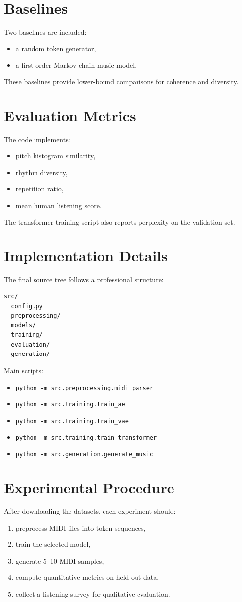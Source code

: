 \documentclass[11pt]{article}
\begin{document}
\section{Baselines}
Two baselines are included:
\begin{itemize}
    \item a random token generator,
    \item a first-order Markov chain music model.
\end{itemize}
These baselines provide lower-bound comparisons for coherence and diversity.

\section{Evaluation Metrics}
The code implements:
\begin{itemize}
    \item pitch histogram similarity,
    \item rhythm diversity,
    \item repetition ratio,
    \item mean human listening score.
\end{itemize}
The transformer training script also reports perplexity on the validation set.

\section{Implementation Details}
The final source tree follows a professional structure:
\begin{verbatim}
src/
  config.py
  preprocessing/
  models/
  training/
  evaluation/
  generation/
\end{verbatim}

Main scripts:
\begin{itemize}
    \item \texttt{python -m src.preprocessing.midi\_parser}
    \item \texttt{python -m src.training.train\_ae}
    \item \texttt{python -m src.training.train\_vae}
    \item \texttt{python -m src.training.train\_transformer}
    \item \texttt{python -m src.generation.generate\_music}
\end{itemize}

\section{Experimental Procedure}
After downloading the datasets, each experiment should:
\begin{enumerate}
    \item preprocess MIDI files into token sequences,
    \item train the selected model,
    \item generate 5--10 MIDI samples,
    \item compute quantitative metrics on held-out data,
    \item collect a listening survey for qualitative evaluation.
\end{enumerate}
\end{document}
